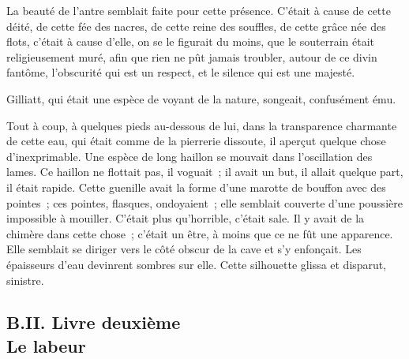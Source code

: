\documentclass[french,twoside]{book} %
\begin{document}
La beauté de l’antre semblait faite pour cette présence. C’était à cause de cette déité, de cette fée des nacres, de cette reine des souffles, de cette grâce née  des flots, c’était à cause d’elle, on se le figurait du moins, que le souterrain était religieusement muré, afin que rien ne pût jamais troubler, autour de ce divin fantôme, l’obscurité qui est un respect, et le silence qui est une majesté.\par
Gilliatt, qui était une espèce de voyant de la nature, songeait, confusément ému.\par
Tout à coup, à quelques pieds au-dessous de lui, dans la transparence charmante de cette eau, qui était comme de la pierrerie dissoute, il aperçut quelque chose d’inexprimable. Une espèce de long haillon se mouvait dans l’oscillation des lames. Ce haillon ne flottait pas, il voguait ; il avait un but, il allait quelque part, il était rapide. Cette guenille avait la forme d’une marotte de bouffon avec des pointes ; ces pointes, flasques, ondoyaient ; elle semblait couverte d’une poussière impossible à mouiller. C’était plus qu’horrible, c’était sale. Il y avait de la chimère dans cette chose ; c’était un être, à moins que ce ne fût une apparence. Elle semblait se diriger vers le côté obscur de la cave et s’y enfonçait. Les épaisseurs d’eau devinrent sombres sur elle. Cette silhouette glissa et disparut, sinistre.\par
  \subsection[{B.II. Livre deuxième. Le labeur}]{B.II. Livre deuxième \\
Le labeur}
\end{document}
